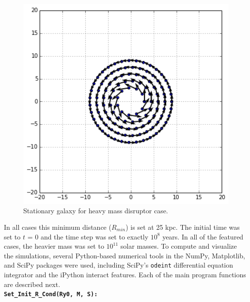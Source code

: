 \documentclass[11pt]{article}
\begin{document}
\begin{figure}[h!]
\centering
\includegraphics[width=5in]{../HeavyPassageImage.png}
\caption{Stationary galaxy for heavy mass disruptor case.}
\label{starlocdirect_fig}
\end{figure}

In all cases this minimum distance ($R_{min}$) is set at 25 kpc.  The initial time was set to $t$ = 0 and the time step was set to exactly $10^8$ years.  In all of the featured cases, the heavier mass was set to $10^{11}$ solar masses.  To compute and visualize the simulations, several Python-based numerical tools in the NumPy, Matplotlib, and SciPy packages were used, including SciPy's \texttt{odeint} differential equation integrator and the iPython interact features.  Each of the main program functions are described next.\\

\textbf{\texttt{Set\_Init\_R\_Cond(Ry0, M, S):}}
\end{document}

